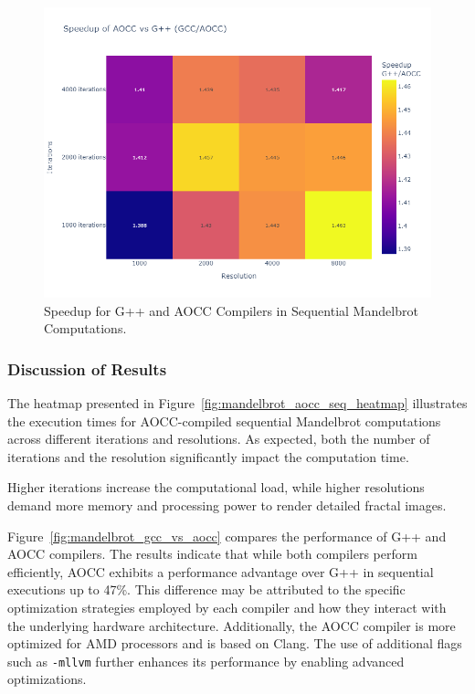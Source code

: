 \documentclass[
	report, %
	11pt, %
]{CSUniSchoolLabReport}
\newcounter{ct}
\begin{document}
\begin{figure}[H]
	\captionsetup{justification=centering, width=.8\linewidth}
	\centering
	\includegraphics[width=\textwidth]{./img/mandelbrot_gcc_vs_aocc_speedup.png}
	\caption{Speedup for G++ and AOCC Compilers in Sequential Mandelbrot Computations.}
	\label{fig:mandelbrot_gcc_vs_aocc_speedup}
\end{figure}

\subsubsection{Discussion of Results}

The heatmap presented in Figure~\ref{fig:mandelbrot_aocc_seq_heatmap} illustrates the execution times for AOCC-compiled sequential Mandelbrot computations across different iterations and resolutions. As expected, both the number of iterations and the resolution significantly impact the computation time.

Higher iterations increase the computational load, while higher resolutions demand more memory and processing power to render detailed fractal images.

Figure~\ref{fig:mandelbrot_gcc_vs_aocc} compares the performance of G++ and AOCC compilers. The results indicate that while both compilers perform efficiently, AOCC exhibits a performance advantage over G++ in sequential executions up to 47\%. This difference may be attributed to the specific optimization strategies employed by each compiler and how they interact with the underlying hardware architecture. Additionally, the AOCC compiler is more optimized for AMD processors and is based on Clang. The use of additional flags such as \texttt{-mllvm} further enhances its performance by enabling advanced optimizations.
\end{document}
